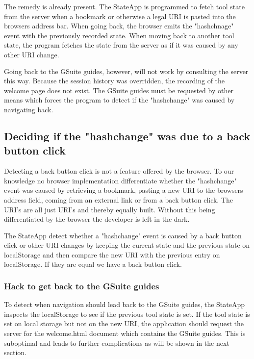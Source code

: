 \documentclass[english]{ifimaster}
\begin{document}
The remedy is already present. The StateApp is programmed to fetch tool state from the server when a bookmark or otherwise a legal URI is pasted into the browsers address bar. When going back, the browser emits the "hashchnage" event with the previously recorded state. When moving back to another tool state, the program fetches the state from the server as if it was caused by any other URI change. 

Going back to the GSuite guides, however, will not work by consulting the server this way. Because the session history was overridden, the recording of the welcome page does not exist. The GSuite guides must be requested by other means which forces the program to detect if the "hashchange" was caused by navigating back. 


\subsection{Deciding if the "hashchange" was due to a back button click} 
Detecting a back button click is not a feature offered by the browser. To our knowledge no browser implementation differentiate whether the "hashchange" event was caused by retrieving a bookmark, pasting a new URI to the browsers address field, coming from an external link or from a back button click. The URI's are all just URI's and thereby equally built. Without this being differentiated by the browser the developer is left in the dark. 

The StateApp detect whether a "hashchange" event is caused by a back button click or other URI changes by keeping the current state and the previous state on localStorage and then compare the new URI with the previous entry on localStorage. If they are equal we have a back button click.

\subsubsection{Hack to get back to the GSuite guides}
To detect when navigation should lead back to the GSuite guides, the StateApp inspects the localStorage to see if the previous tool state is set. If the tool state is set on local storage but not on the new URI, the application should request the server for the welcome.html document which contains the GSuite guides. This is suboptimal and leads to further complications as will be shown in the next section.

\label{sec:rethinkingDesign}
\end{document}
